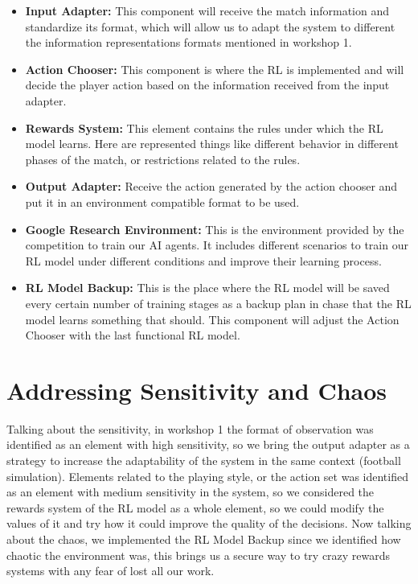 \documentclass{article}
\begin{document}
\begin{itemize}
    \item \textbf{Input Adapter:} This component will receive the match information and standardize its format, which will allow us to adapt the system to different the information representations formats mentioned in workshop 1.
    
    \item \textbf{Action Chooser:} This component is where the RL is implemented and will decide the player action based on the information received from the input adapter.
    
    \item \textbf{Rewards System:} This element contains the rules under which the RL model learns. Here are represented things like different behavior in different phases of the match, or restrictions related to the rules.
    
    \item \textbf{Output Adapter:} Receive the action generated by the action chooser and put it in an environment compatible format to be used.
    
    \item \textbf{Google Research Environment:} This is the environment provided by the competition to train our AI agents. It includes different scenarios to train our RL model under different conditions and improve their learning process.
    
    \item \textbf{RL Model Backup:} This is the place where the RL model will be saved every certain number of training stages as a backup plan in chase that the RL model learns something that should. This component will adjust the Action Chooser with the last functional RL model.
\end{itemize}

\section*{Addressing Sensitivity and Chaos}
Talking about the sensitivity, in workshop 1 the format of observation was identified as an element with high sensitivity, so we bring the output adapter as a strategy to increase the adaptability of the system in the same context (football simulation). Elements related to the playing style, or the action set was identified as an element with medium sensitivity in the system, so we considered the rewards system of the RL model as a whole element, so we could modify the values of it and try how it could improve the quality of the decisions. Now talking about the chaos, we implemented the RL Model Backup since we identified how chaotic the environment was, this brings us a secure way to try crazy rewards systems with any fear of lost all our work.
\end{document}
